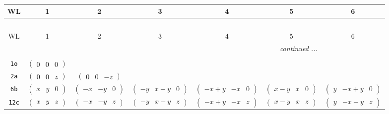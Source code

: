 \documentclass[fleqn,9pt,landscape]{jsarticle}
\begin{document}
\begin{center}
\renewcommand{\arraystretch}{1.2}
\begin{longtable}{ccccccc}
 \hline \hline
WL & 1 & 2 & 3 & 4 & 5 & 6 \\ \hline \endfirsthead

\multicolumn{6}{l}{\tablename\ \thetable{}} \\
 \hline \hline
WL & 1 & 2 & 3 & 4 & 5 & 6 \\ \hline \endhead

 \hline \hline
\multicolumn{6}{r}{\footnotesize\it continued ...} \\ \endfoot

 \hline \hline
\multicolumn{6}{r}{} \\ \endlastfoot

{\tt 1o} & $ \begin{pmatrix} 0 & 0 & 0 \end{pmatrix} $ & $  $ & $  $ & $  $ & $  $ & $  $ \\ \hline
{\tt 2a} & $ \begin{pmatrix} 0 & 0 & z \end{pmatrix} $ & $ \begin{pmatrix} 0 & 0 & - z \end{pmatrix} $ & $  $ & $  $ & $  $ & $  $ \\ \hline
{\tt 6b} & $ \begin{pmatrix} x & y & 0 \end{pmatrix} $ & $ \begin{pmatrix} - x & - y & 0 \end{pmatrix} $ & $ \begin{pmatrix} - y & x - y & 0 \end{pmatrix} $ & $ \begin{pmatrix} - x + y & - x & 0 \end{pmatrix} $ & $ \begin{pmatrix} x - y & x & 0 \end{pmatrix} $ & $ \begin{pmatrix} y & - x + y & 0 \end{pmatrix} $ \\ \hline
{\tt 12c} & $ \begin{pmatrix} x & y & z \end{pmatrix} $ & $ \begin{pmatrix} - x & - y & z \end{pmatrix} $ & $ \begin{pmatrix} - y & x - y & z \end{pmatrix} $ & $ \begin{pmatrix} - x + y & - x & z \end{pmatrix} $ & $ \begin{pmatrix} x - y & x & z \end{pmatrix} $ & $ \begin{pmatrix} y & - x + y & z \end{pmatrix} $ \\

\end{longtable}
\end{center}
\end{document}
